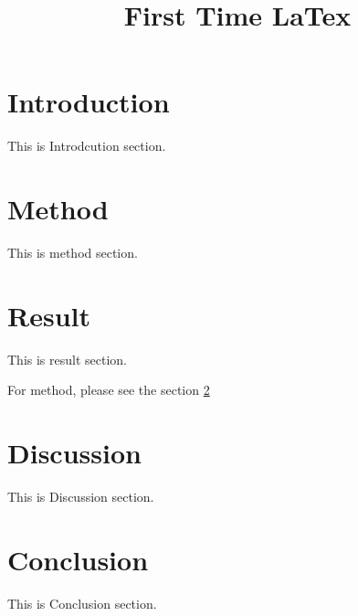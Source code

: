 \documentclass{article}
\title{First Time LaTex}
\begin{document}
\tableofcontents

\section{Introduction}

This is Introdcution section.

\section{Method}
\label{sec:method}

This is method section.

\section{Result}

This is result section.

For method, please see the section \ref{sec:method}


\section{Discussion}

This is Discussion section.

\section{Conclusion}

This is Conclusion section.
\end{document}
